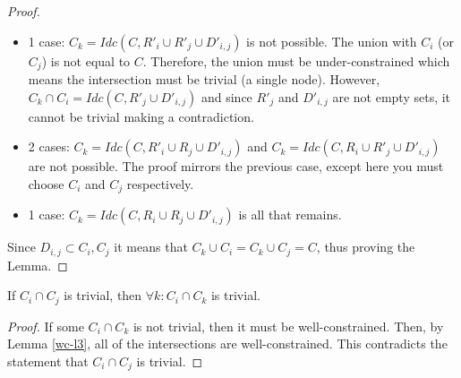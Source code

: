 \begin{proof}
\begin{itemize}
    \item 1 case:  $C_k=Idc(C,R'_i\cup R'_j\cup D'_{i,j})$ is not possible. The union with $C_i$ (or $C_j$) is not equal to $C$. Therefore, the union must be under-constrained which means the intersection must be trivial (a single node). However, $C_k\cap C_i=Idc(C,R'_j\cup D'_{i,j})$ and since $R'_j$ and $D'_{i,j}$ are not empty sets, it cannot be trivial making a contradiction.

    \item 2 cases:  $C_k=Idc(C,R'_i\cup R_j\cup D'_{i,j})$ and $C_k=Idc(C,R_i\cup R'_j\cup D'_{i,j})$ are not possible. The proof mirrors the previous case, except here you must choose $C_i$ and $C_j$ respectively.

    \item 1 case: $C_k=Idc(C,R_i\cup R_j\cup D'_{i,j})$ is all that remains.
\end{itemize}

Since $D_{i,j}\subset C_i, C_j$ it means that $C_k\cup C_i = C_k \cup C_j = C$, thus proving the Lemma.

\end{proof}








\begin{lemma}\label{uc-l2}
If $C_i\cap C_j$ is trivial, then $\forall k: C_i\cap C_k$ is trivial.
\end{lemma}

\begin{proof}
If some $C_i\cap C_k$ is not trivial, then it must be well-constrained. Then, by Lemma \ref{wc-l3}, all of the intersections are well-constrained. This contradicts the statement that $C_i\cap C_j$ is trivial.
\end{proof}




